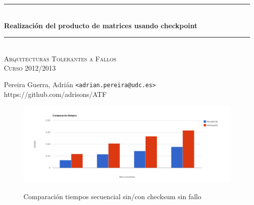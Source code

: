 \documentclass[a4paper]{article}
\newcommand{\HRule}{\rule{\linewidth}{0.5mm}}
\begin{document}
		\begin{center}

			\HRule \\[0.4cm]
			{ \huge \bfseries Realización del producto de matrices usando checkpoint}\\[0.4cm]
			\HRule \\[0cm]

			\vspace{1cm}
			\textsc{\Large Arquitecturas Tolerantes a Fallos}\\[0.5cm]
			\textsc{\Large Curso 2012/2013}\\[0.5cm]

		\end{center}

		\begin{center}
		Pereira Guerra, Adrián \texttt{<adrian.pereira@udc.es>}\\
    https://github.com/adrisons/ATF
		\end{center}
		\vspace{2cm}




	

	

\begin{figure}[h!]
  \includegraphics[width=1.2\textwidth]{res/comparacion_cp}
  \label{comp_cp}
  \caption{Comparación tiempos secuencial sin/con checksum sin fallo}
\end{figure}
\end{document}

